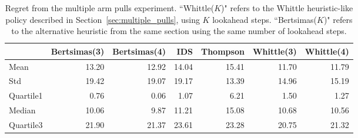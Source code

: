 \begin{table}
	\centering
	\begin{tabular}{lrrrrrr}
		\toprule
		{} &  Bertsimas(3) &  Bertsimas(4) &   IDS &  Thompson &  Whittle(3) &  Whittle(4) \\
		\midrule
		Mean      &         13.20 &         12.92 & 14.04 &     15.41 &       11.70 &       11.79 \\
		Std       &         19.42 &         19.07 & 19.17 &     13.39 &       14.96 &       15.19 \\
		Quartile1 &          0.76 &          0.06 &  1.07 &      6.21 &        1.50 &        1.27 \\
		Median    &         10.06 &          9.87 & 11.21 &     15.08 &       10.68 &       10.56 \\
		Quartile3 &         21.90 &         21.37 & 23.61 &     23.28 &       20.75 &       21.32 \\
		\bottomrule
	\end{tabular}
	\caption{Regret from the multiple arm pulls experiment. ``Whittle($K$)" refers to the Whittle heuristic-like policy described in Section~\ref{sec:multiple_pulls}, using $K$ lookahead steps. ``Bertsimas($K$)" refers to the alternative heuristic from the same section using the same number of lookahead steps.}
	\label{table:restless1_summary}
\end{table}
